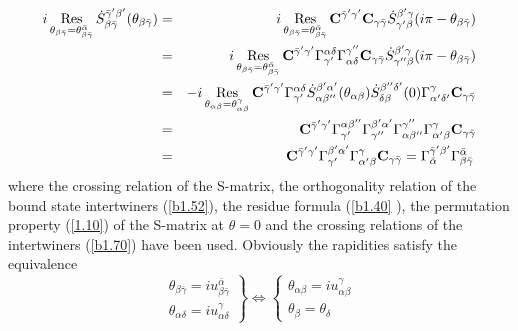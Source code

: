\documentclass[a4paper,a4paper]{article}
\begin{document}
\begin{eqnarray*}
i\mathop{\rm Res}_{\theta _{\beta \bar{\gamma}}=\theta _{\beta \bar{\gamma}%
}^{\bar{\alpha}}}\dot{S}_{\beta \bar{\gamma}}^{\bar{\gamma}^{\prime }\beta
^{\prime }}(\theta _{\beta \bar{\gamma}}) &=&i\mathop{\rm Res}_{\theta
_{\beta \bar{\gamma}}=\theta _{\beta \bar{\gamma}}^{\bar{\alpha}}}\mathbf{C}%
^{\bar{\gamma}^{\prime }\gamma ^{\prime }}\mathbf{C}_{\gamma \bar{\gamma}}%
\dot{S}_{\gamma ^{\prime }\beta }^{\beta ^{\prime }\gamma }(i\pi -\theta
_{\beta \bar{\gamma}}) \\
&=&i\mathop{\rm Res}_{\theta _{\beta \bar{\gamma}}=\theta _{\beta \bar{\gamma%
}}^{\bar{\alpha}}}\mathbf{C}^{\bar{\gamma}^{\prime }\gamma ^{\prime }}\Gamma
_{\gamma ^{\prime }}^{\alpha \delta }\Gamma _{\alpha \delta }^{\gamma
^{\prime \prime }}\mathbf{C}_{\gamma \bar{\gamma}}\dot{S}_{\gamma ^{\prime
\prime }\beta }^{\beta ^{\prime }\gamma }(i\pi -\theta _{\beta \bar{\gamma}})
\\
&=&-i\mathop{\rm Res}_{\theta _{\alpha \beta }=\theta _{\alpha \beta
}^{\gamma }}\mathbf{C}^{\bar{\gamma}^{\prime }\gamma ^{\prime }}\Gamma
_{\gamma ^{\prime }}^{\alpha \delta }\dot{S}_{\alpha \beta ^{\prime \prime
}}^{\beta ^{\prime }\alpha ^{\prime }}(\theta _{\alpha \beta })\dot{S}%
_{\delta \beta }^{\beta ^{\prime \prime }\delta ^{\prime }}(0)\Gamma
_{\alpha ^{\prime }\delta ^{\prime }}^{\gamma }\mathbf{C}_{\gamma \bar{\gamma%
}} \\
&=&\mathbf{C}^{\bar{\gamma}^{\prime }\gamma ^{\prime }}\Gamma _{\gamma
^{\prime }}^{\alpha \beta ^{\prime \prime }}\Gamma _{\gamma ^{\prime \prime
}}^{\beta ^{\prime }\alpha ^{\prime }}\Gamma _{\alpha \beta ^{\prime \prime
}}^{\gamma ^{\prime \prime }}\Gamma _{\alpha ^{\prime }\beta }^{\gamma }%
\mathbf{C}_{\gamma \bar{\gamma}} \\
&=&\mathbf{C}^{\bar{\gamma}^{\prime }\gamma ^{\prime }}\Gamma _{\gamma
^{\prime }}^{\beta ^{\prime }\alpha ^{\prime }}\Gamma _{\alpha ^{\prime
}\beta }^{\gamma }\mathbf{C}_{\gamma \bar{\gamma}}=\Gamma _{\bar{\alpha}}^{%
\bar{\gamma}^{\prime }\beta ^{\prime }}\Gamma _{\beta \bar{\gamma}}^{\bar{%
\alpha}}\,
\end{eqnarray*}
where the crossing relation of the S-matrix, the orthogonality relation of
the bound state intertwiners (\ref{b1.52}), the residue formula (\ref{b1.40}%
), the permutation property (\ref{1.10}) of the S-matrix at $\theta =0$ and
the crossing relations of the intertwiners (\ref{b1.70}) have been used.
Obviously the rapidities satisfy the equivalence 
\[
\left. 
\begin{array}{c}
\theta _{\beta \bar{\gamma}}=iu_{\beta \bar{\gamma}}^{\bar{\alpha}} \\ 
\theta _{\alpha \delta }=iu_{\alpha \delta }^{\gamma }
\end{array}
\right\} \Leftrightarrow \left\{ 
\begin{array}{c}
\theta _{\alpha \beta }=iu_{\alpha \beta }^{\gamma } \\ 
\theta _{\beta }=\theta _{\delta }
\end{array}
\right. 
\]
\end{document}
